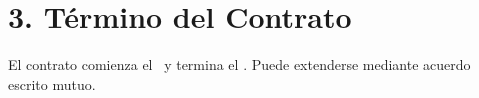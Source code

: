 \section*{3. Término del Contrato}
El contrato comienza el \Rentstartdate\ y termina el \Rentenddate. Puede extenderse mediante acuerdo escrito mutuo.
